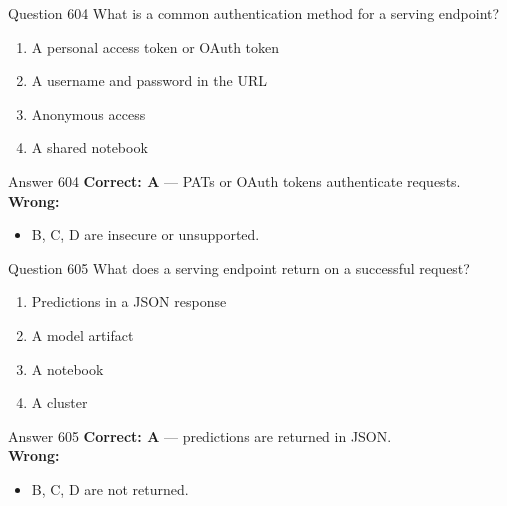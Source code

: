\documentclass[aspectratio=169,11pt]{beamer}
\begin{document}
	\begin{frame}{Question 604}
		What is a common authentication method for a serving endpoint?
		\begin{enumerate}[label=\Alph*.]
			\item A personal access token or OAuth token
			\item A username and password in the URL
			\item Anonymous access
			\item A shared notebook
		\end{enumerate}
	\end{frame}
	\begin{frame}{Answer 604}
		\textbf{Correct: A} --- PATs or OAuth tokens authenticate requests.\\
		\vspace{0.5em}
		\textbf{Wrong:}
		\begin{itemize}
			\item B, C, D are insecure or unsupported.
		\end{itemize}
	\end{frame}
	
	\begin{frame}{Question 605}
		What does a serving endpoint return on a successful request?
		\begin{enumerate}[label=\Alph*.]
			\item Predictions in a JSON response
			\item A model artifact
			\item A notebook
			\item A cluster
		\end{enumerate}
	\end{frame}
	\begin{frame}{Answer 605}
		\textbf{Correct: A} --- predictions are returned in JSON.\\
		\vspace{0.5em}
		\textbf{Wrong:}
		\begin{itemize}
			\item B, C, D are not returned.
		\end{itemize}
	\end{frame}
	
\end{document}
